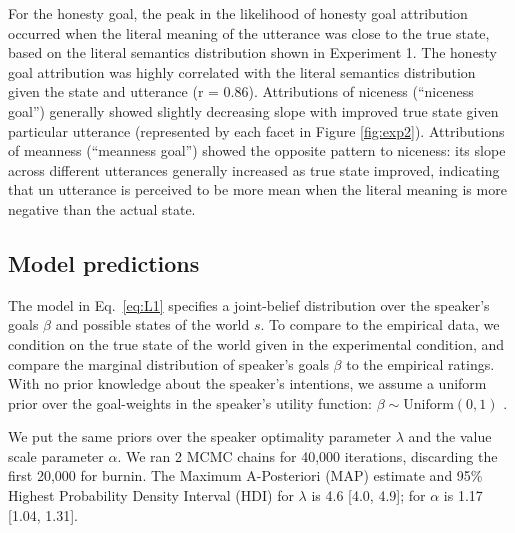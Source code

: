 \documentclass[10pt,letterpaper]{article}
\begin{document}
For the honesty goal, the peak in the likelihood of honesty goal attribution occurred when the literal meaning of the utterance was close to the true state, based on the literal semantics distribution shown in Experiment 1. The honesty goal attribution was highly correlated with the literal semantics distribution given the state and utterance (r = 0.86). 
Attributions of niceness (``niceness goal'') generally showed slightly decreasing slope with improved true state given particular utterance (represented by each facet in Figure \ref{fig:exp2}). 
Attributions of meanness (``meanness goal'') showed the opposite pattern to niceness: its slope across different utterances generally increased as true state improved, indicating that un utterance is perceived to be more mean when the literal meaning is more negative than the actual state.

\subsection{Model predictions}

The model in Eq.~\ref{eq:L1} specifies a joint-belief distribution over the speaker's goals $\beta$ and possible states of the world $s$.
To compare to the empirical data, we condition on the true state of the world given in the experimental condition, and compare the marginal distribution of speaker's goals $\beta$ to the empirical ratings.
With no prior knowledge about the speaker's intentions, we assume a uniform prior over the goal-weights in the speaker's utility function: $\beta \sim \text{Uniform}(0,1)$ .

We put the same priors over the speaker optimality parameter $\lambda$ and the value scale parameter $\alpha$.
We ran 2 MCMC chains for 40,000 iterations, discarding the first 20,000 for burnin.
The Maximum A-Posteriori (MAP) estimate and 95\% Highest Probability Density Interval (HDI) for $\lambda$ is 4.6 [4.0, 4.9]; for $\alpha$ is 1.17 [1.04, 1.31].%

\end{document}

